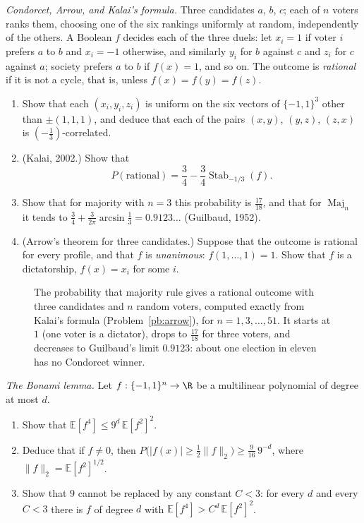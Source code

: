 \begin{exercise}[$\star\star\star$]\label{pb:arrow}
\emph{Condorcet, Arrow, and Kalai's formula.} Three candidates $a$, $b$, $c$; each of $n$ voters ranks them, choosing one of the six
rankings uniformly at random, independently of the others. A Boolean $f$ decides each of the three duels: let $x_i=1$ if voter $i$
prefers $a$ to $b$ and $x_i=-1$ otherwise, and similarly $y_i$ for $b$ against $c$ and $z_i$ for $c$ against $a$; society prefers $a$ to
$b$ if $f(x)=1$, and so on. The outcome is \emph{rational} if it is not a cycle, that is, unless $f(x)=f(y)=f(z)$.
\begin{enumerate}[label=(\alph*)]
\item Show that each $(x_i,y_i,z_i)$ is uniform on the six vectors of $\{-1,1\}^3$ other than $\pm(1,1,1)$, and deduce that each of the
pairs $(x,y)$, $(y,z)$, $(z,x)$ is $(-\frac13)$-correlated.
\item (Kalai, 2002.) Show that
\[
P(\text{rational})=\frac34-\frac34\operatorname{Stab}_{-1/3}(f).
\]
\item Show that for majority with $n=3$ this probability is $\frac{17}{18}$, and that for $\operatorname{Maj}_n$ it tends to
$\frac34+\frac3{2\pi}\arcsin\frac13=0.9123\ldots$ (Guilbaud, 1952).
\item (Arrow's theorem for three candidates.) Suppose that the outcome is rational for every profile, and that $f$ is
\emph{unanimous}: $f(1,\dots,1)=1$. Show that $f$ is a dictatorship, $f(x)=x_i$ for some $i$.
\end{enumerate}
\end{exercise}

\begin{figure}[ht]
\centering
{}
\caption{The probability that majority rule gives a rational outcome with three candidates and $n$ random voters, computed
exactly from Kalai's formula (Problem~\ref{pb:arrow}), for $n=1,3,\dots,51$. It starts at $1$ (one voter is a dictator), drops to
$\frac{17}{18}$ for three voters, and decreases to Guilbaud's limit $0.9123$: about one election in eleven has no Condorcet winner.}
\label{fig:condorcet}
\end{figure}

\begin{exercise}[$\star\star\star$]\label{pb:bonami}
\emph{The Bonami lemma.} Let $f:\{-1,1\}^n\to\R$ be a multilinear polynomial of degree at most $d$.
\begin{enumerate}[label=(\alph*)]
\item Show that $\mathbb E[f^4]\le9^d\,\mathbb E[f^2]^2$.
\item Deduce that if $f\ne0$, then $P\bigl(|f(x)|\ge\frac12\|f\|_2\bigr)\ge\frac9{16}\,9^{-d}$, where $\|f\|_2=\mathbb E[f^2]^{1/2}$.
\item Show that $9$ cannot be replaced by any constant $C<3$: for every $d$ and every $C<3$ there is $f$ of degree $d$ with
$\mathbb E[f^4]>C^d\,\mathbb E[f^2]^2$.
\end{enumerate}
\end{exercise}

